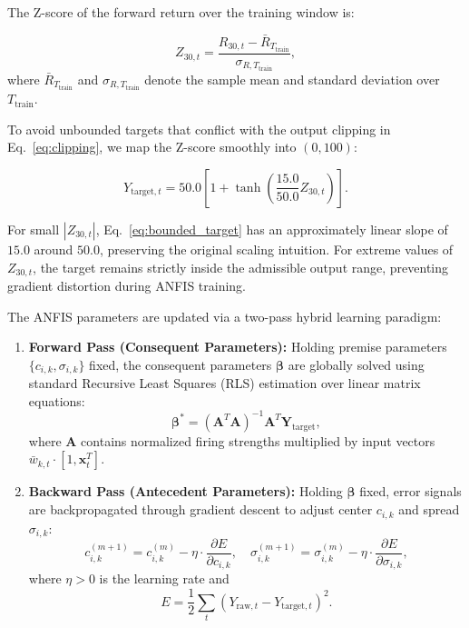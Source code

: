 \documentclass[pdflatex,sn-mathphys-num]{sn-jnl}
\theoremstyle{thmstyleone}
\theoremstyle{thmstyletwo}
\theoremstyle{thmstylethree}
\begin{document}
The Z-score of the forward return over the training window is:

\begin{equation}
    Z_{30,t} = \frac{R_{30,t} - \bar{R}_{T_{\mathrm{train}}}}{\sigma_{R, T_{\mathrm{train}}}},
    \label{eq:zscore}
\end{equation}
where $\bar{R}_{T_{\mathrm{train}}}$ and $\sigma_{R, T_{\mathrm{train}}}$ denote the sample mean and standard deviation over $T_{\mathrm{train}}$.

To avoid unbounded targets that conflict with the output clipping in Eq.~\eqref{eq:clipping}, we map the Z-score smoothly into $(0,100)$:

\begin{equation}
    Y_{\mathrm{target},t}
    =
    50.0 \left[
    1 + \tanh\left( \frac{15.0}{50.0} Z_{30,t} \right)
    \right].
    \label{eq:bounded_target}
\end{equation}

For small $|Z_{30,t}|$, Eq.~\eqref{eq:bounded_target} has an approximately linear slope of $15.0$ around $50.0$, preserving the original scaling intuition. For extreme values of $Z_{30,t}$, the target remains strictly inside the admissible output range, preventing gradient distortion during ANFIS training.

The ANFIS parameters are updated via a two-pass hybrid learning paradigm:
\begin{enumerate}
    \item \textbf{Forward Pass (Consequent Parameters):} Holding premise parameters $\{c_{i,k}, \sigma_{i,k}\}$ fixed, the consequent parameters $\boldsymbol{\beta}$ are globally solved using standard Recursive Least Squares (RLS) estimation over linear matrix equations:
    \begin{equation}
        \boldsymbol{\beta}^* = (\mathbf{A}^T \mathbf{A})^{-1} \mathbf{A}^T \mathbf{Y}_{\mathrm{target}},
        \label{eq:rls}
    \end{equation}
    where $\mathbf{A}$ contains normalized firing strengths multiplied by input vectors $\bar{w}_{k,t} \cdot [1, \mathbf{x}_t^T]$.
    \item \textbf{Backward Pass (Antecedent Parameters):} Holding $\boldsymbol{\beta}$ fixed, error signals are backpropagated through gradient descent to adjust center $c_{i,k}$ and spread $\sigma_{i,k}$:
    \begin{equation}
        c_{i,k}^{(m+1)} = c_{i,k}^{(m)} - \eta \cdot \frac{\partial E}{\partial c_{i,k}}, \quad
        \sigma_{i,k}^{(m+1)} = \sigma_{i,k}^{(m)} - \eta \cdot \frac{\partial E}{\partial \sigma_{i,k}},
        \label{eq:gradient_descent}
    \end{equation}
    where $\eta > 0$ is the learning rate and
    \begin{equation}
        E = \frac{1}{2}\sum_{t} \left(Y_{\mathrm{raw},t} - Y_{\mathrm{target},t}\right)^2.
    \end{equation}
\end{enumerate}
\end{document}
